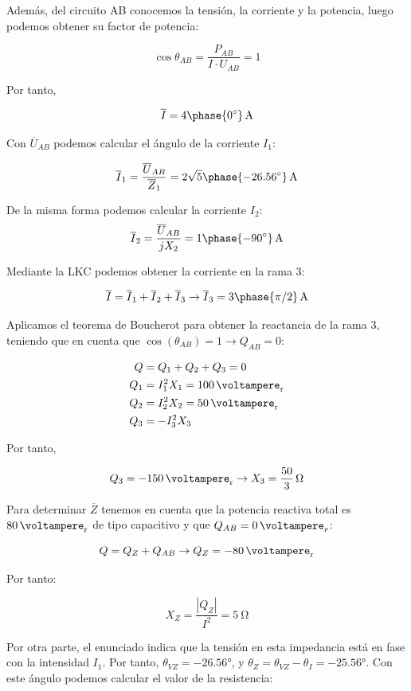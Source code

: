 Además, del circuito AB conocemos la tensión, la corriente y la potencia, luego podemos obtener su factor de potencia:

\[
  \cos\theta_{AB} = \frac{P_{AB}}{I \cdot U_{AB}} = 1
\]

Por tanto,

\[
  \overline{I} = \qty[parse-numbers=false]{4\phase{\ang{0}}}{\ampere}
\]


Con $\overline{U}_{AB}$ podemos calcular el ángulo de la corriente $I_1$:

\[
  \overline{I}_1 = \frac{\overline{U}_{AB}}{\overline{Z}_1} = \qty[parse-numbers=false]{2\sqrt{5}\phase{\ang{-26.56}}}{\ampere} 
\]

De la misma forma podemos calcular la corriente $I_2$:
\[
  \overline{I}_2 = \frac{\overline{U}_{AB}}{jX_2} = \qty[parse-numbers=false]{1\phase{\ang{-90}}}{\ampere} 
\]
  
Mediante la LKC podemos obtener la corriente en la rama 3:

\[
  \overline{I} = \overline{I}_1 + \overline{I}_2 + \overline{I}_3 \rightarrow \overline{I}_3 = \qty[parse-numbers=false]{3\phase{\pi/2}}{\ampere}
\]

Aplicamos el teorema de Boucherot para obtener la reactancia de la rama 3, teniendo que en cuenta que $\cos(\theta_{AB}) = 1 \rightarrow Q_{AB} = 0$:

\begin{align*}
  Q &= Q_1 + Q_2 + Q_3 = 0\\
  Q_1 &= I_1^2 X_1 = \qty{100}{\voltampere_r}\\
  Q_2 &= I_2^2 X_2 = \qty{50}{\voltampere_r}\\
  Q_3 &= - I_3^2 X_3
\end{align*}

Por tanto,

\[
   Q_3 = -\qty{150}{\voltampere_r} \rightarrow X_3 = \qty[parse-numbers=false]{\frac{50}{3}}{\ohm}
\]

Para determinar $\overline{Z}$ tenemos en cuenta que la potencia reactiva total es $\qty{80}{\voltampere_r}$ de tipo capacitivo y que $Q_{AB} = \qty{0}{\voltampere}_r$:

\[
  Q = Q_Z + Q_{AB} \rightarrow Q_Z = -\qty{80}{\voltampere_r} 
\]

Por tanto:

\[
  X_Z = \frac{|Q_Z|}{I^2} = \qty{5}{\ohm}
\]

Por otra parte, el enunciado indica que la tensión en esta impedancia está en fase con la intensidad $I_1$. Por tanto, $\theta_{VZ} = \ang{-26.56}$, y $\theta_Z = \theta_{VZ} - \theta_{I} = \ang{-25.56}$. Con este ángulo podemos calcular el valor de la resistencia:

